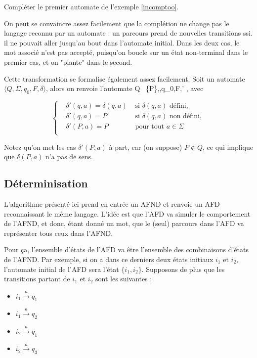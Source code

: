 \begin{exercice}
Compléter le premier automate de l'exemple \ref{incomptoo}.
\end{exercice}

On peut se convaincre assez facilement que la complétion ne change pas le langage reconnu par un automate : un parcours prend de nouvelles transitions ssi. il ne pouvait aller jusqu'au bout dans l'automate initial. Dans les deux cas, le mot associé n'est pas accepté, puisqu'on boucle sur un état non-terminal dans le premier cas, et on "plante" dans le second.

Cette transformation se formalise également assez facilement. Soit un automate $\big \langle Q,\Sigma,q_0,F,\delta \big \rangle$, alors on renvoie l'automate \big \langle Q \cup~\{P\},\Sigma,q_0,F,\delta' \big \rangle, avec

\[
\left\{\!\begin{aligned}
&\delta'(q,a) = \delta(q,a) &\text{ si } \delta(q,a) \text{ défini},\\[1ex]
&\delta'(q,a) = P &\text{ si } \delta(q,a) \text{ non défini},\\[1ex]
&\delta'(P,a) = P &\text{ pour tout } a \in \Sigma\\[1ex]
\end{aligned}
\]

Notez qu'on met les cas $\delta'(P,a)$ à part, car (on suppose) $P \not\in Q$, ce qui implique que $\delta(P,a)$ n'a pas de sens.

\subsection{Déterminisation}
\label{det}

L'algorithme présenté ici prend en entrée un AFND et renvoie un AFD reconnaissant le même langage. L'idée est que l'AFD va simuler le comportement de l'AFND, et donc, étant donné un mot, que le (seul) parcours dans l'AFD va représenter tous ceux dans l'AFND.

Pour ça, l'ensemble d'états de l'AFD va être l'ensemble des combinaisons d'états de l'AFND. Par exemple, si on a dans ce derniers deux états initiaux $i_1$ et $i_2$, l'automate initial de l'AFD sera l'état $\{i_1, i_2\}$. Supposons de plus que les transitions partant de $i_1$ et $i_2$ sont les suivantes :

\begin{itemize}
\item $i_1 \xrightarrow{a} q_1$
\item $i_1 \xrightarrow{a} q_2$
\item $i_2 \xrightarrow{a} q_1$
\item $i_2 \xrightarrow{a} q_3$
\end{itemize}

